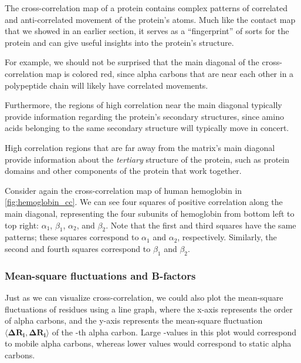 The cross-correlation map of a protein contains complex patterns of correlated and anti-correlated movement of the protein's atoms. Much like the contact map that we showed in an earlier section, it serves as a ``fingerprint'' of sorts for the protein and can give useful insights into the protein's structure.

For example, we should not be surprised that the main diagonal of the cross-correlation map is colored red, since alpha carbons that are near each other in a polypeptide chain will likely have correlated movements.

Furthermore, the regions of high correlation near the main diagonal typically provide information regarding the protein's secondary structures, since amino acids belonging to the same secondary structure will typically move in concert.

High correlation regions that are far away from the matrix's main diagonal provide information about the \textit{tertiary} structure of the protein, such as protein domains and other components of the protein that work together.

Consider again the cross-correlation map of human hemoglobin in \autoref{fig:hemoglobin_cc}. We can see four squares of positive correlation along the main diagonal, representing the four subunits of hemoglobin from bottom left to top right: $\alpha_1$, $\beta_1$, $\alpha_2$, and $\beta_2$. Note that the first and third squares have the same patterns; these squares correspond to $\alpha_1$ and $\alpha_2$, respectively. Similarly, the second and fourth squares correspond to $\beta_1$ and $\beta_2$.\\

\begin{qbox}\end{qbox}

\FloatBarrier
{}
\subsubsection{Mean-square fluctuations and B-factors}

Just as we can visualize cross-correlation, we could also plot the mean-square fluctuations of residues using a line graph, where the x-axis represents the order of alpha carbons, and the y-axis represents the mean-square fluctuation $ \langle \mathbf{\Delta R_i}, \mathbf{\Delta R_i} \rangle $ of the -th alpha carbon. Large -values in this plot would correspond to mobile alpha carbons, whereas lower values would correspond to static alpha carbons.

